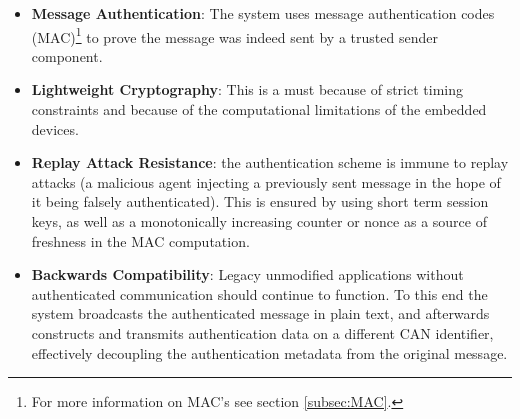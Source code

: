 \begin{itemize}
	\item \textbf{Message Authentication}: The system uses message authentication codes (MAC)\footnote{For more information on MAC's see section \ref{subsec:MAC}.} to prove the message was indeed sent by a trusted sender component.
	
	\item \textbf{Lightweight Cryptography}: This is a must because of strict timing constraints and because of the computational limitations of the embedded devices. 
	
	\item \textbf{Replay Attack Resistance}: the authentication scheme is immune to replay attacks (a malicious agent injecting a previously sent message in the hope of it being falsely authenticated). This is ensured by using short term session keys, as well as a monotonically increasing counter or nonce as a source of freshness in the MAC computation.
	
	\item \textbf{Backwards Compatibility}: Legacy unmodified applications without authenticated communication should continue to function. To this end the system broadcasts the authenticated message in plain text, and afterwards constructs and transmits authentication data on a different CAN identifier, effectively decoupling the authentication metadata from the original message.
\end{itemize}



